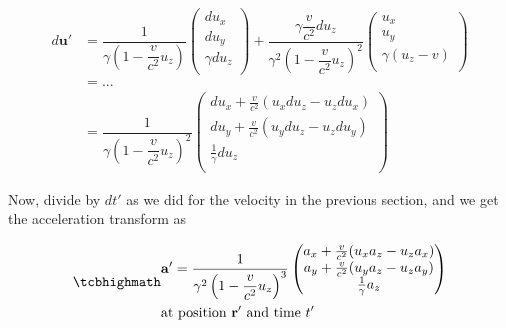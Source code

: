 \begin{equation}
	\begin{aligned}
		d\mathbf{u}{'} & = \dfrac{1}{{\gamma}\left(1-\dfrac{v}{{c}^2} {{u}_{z}}\right) }
		\begin{pmatrix}
			d{{u}_{x}}          \\
			d{{u}_{y}}          \\
			{\gamma} d{{u}_{z}} \\
		\end{pmatrix}
		+ \dfrac{{\gamma} \dfrac{v}{{c}^2} d{{u}_{z}}}{{\gamma}^2\left(1-\dfrac{v}{{c}^2} {{u}_{z}}\right)^2 }
		\begin{pmatrix}
			{{u}_{x}}                              \\
			{{u}_{y}}                              \\
			{\gamma} \left( {{u}_{z}}- {v} \right) \\
		\end{pmatrix} \\
		               & = ...
		\\
		               & = \dfrac{1}{{\gamma}\left(1-\dfrac{v}{{c}^2} {{u}_{z}}\right)^2 }
		\begin{pmatrix}
			d{{u}_{x}} + \frac{v}{{c}^2}( {{u}_{x}} d{{u}_{z}}-{{u}_{z}} d{{u}_{x}}) \\
			d{{u}_{y}} + \frac{v}{{c}^2}( {{u}_{y}} d{{u}_{z}}-{{u}_{z}} d{{u}_{y}}) \\
			\frac{1}{{\gamma}} d{{u}_{z}}                                            \\
		\end{pmatrix}
	\end{aligned}
\end{equation}

Now, divide by ${dt{'}}$ as we did for the velocity in the previous section, and we get the acceleration transform as

\begin{equation}
	\mhl{
		\begin{aligned}
			&\mathbf{a}{'} = \dfrac{1}{{\gamma}^2\left(1-\dfrac{v}{{c}^2} {{u}_{z}}\right)^3 }
			\begin{pmatrix}
				{{a}_{x}} + \frac{v}{{c}^2}({{u}_{x}} {{a}_{z}}-{{u}_{z}} {{a}_{x}}) \\
				{{a}_{y}} + \frac{v}{{c}^2}({{u}_{y}} {{a}_{z}}-{{u}_{z}} {{a}_{y}}) \\
				\frac{1}{{\gamma}} {{a}_{z}}                                         \\
			\end{pmatrix}
			\\
			&\text{at position ${\mathbf{r}{'}}$ and time ${t{'}}$ }
		\end{aligned}
	}
	\label{eq: acceleration transform}
\end{equation}

